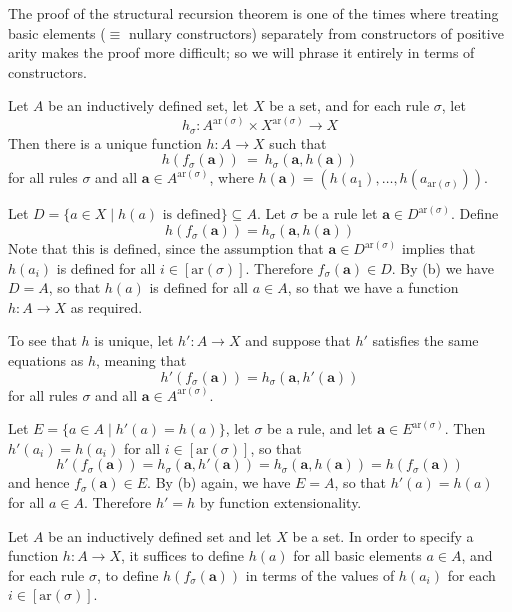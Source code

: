 The proof of the structural recursion theorem is one of the times where treating basic elements ($\equiv$ nullary constructors) separately from constructors of positive arity makes the proof more difficult; so we will phrase it entirely in terms of constructors.

\begin{theorem}
\label{thmStructuralRecursion}
Let $A$ be an inductively defined set, let $X$ be a set, and for each rule $\sigma$, let
\[ h_{\sigma} : A^{\mathrm{ar}(\sigma)} \times X^{\mathrm{ar}(\sigma)} \to X \]
Then there is a unique function $h : A \to X$ such that
\[ h(f_{\sigma}(\mathbf{a})) ~=~ h_{\sigma}(\mathbf{a},h(\mathbf{a})) \]
for all rules $\sigma$ and all $\mathbf{a} \in A^{\mathrm{ar}(\sigma)}$, where $h(\mathbf{a}) = (h(a_1),\dots,h(a_{\mathrm{ar}(\sigma)}))$.
\end{theorem}

\begin{cproof}
Let $D = \{ a \in X \mid h(a) \text{ is defined} \} \subseteq A$. Let $\sigma$ be a rule let $\mathbf{a} \in D^{\mathrm{ar}(\sigma)}$. Define
\[ h(f_{\sigma}(\mathbf{a})) = h_{\sigma}(\mathbf{a},h(\mathbf{a})) \]
Note that this is defined, since the assumption that $\mathbf{a} \in D^{\mathrm{ar}(\sigma)}$ implies that $h(a_i)$ is defined for all $i \in [\mathrm{ar}(\sigma)]$. Therefore $f_{\sigma}(\mathbf{a}) \in D$.
By (b) we have $D=A$, so that $h(a)$ is defined for all $a \in A$, so that we have a function $h : A \to X$ as required.

To see that $h$ is unique, let $h' : A \to X$ and suppose that $h'$ satisfies the same equations as $h$, meaning that
\[ h'(f_{\sigma}(\mathbf{a})) = h_{\sigma}(\mathbf{a},h'(\mathbf{a})) \]
for all rules $\sigma$ and all $\mathbf{a} \in A^{\mathrm{ar}(\sigma)}$.

Let $E = \{ a \in A \mid h'(a) = h(a) \}$, let $\sigma$ be a rule, and let $\mathbf{a} \in E^{\mathrm{ar}(\sigma)}$. Then $h'(a_i) = h(a_i)$ for all $i \in [\mathrm{ar}(\sigma)]$, so that
\[ h'(f_{\sigma}(\mathbf{a})) = h_{\sigma}(\mathbf{a},h'(\mathbf{a})) = h_{\sigma}(\mathbf{a},h(\mathbf{a})) = h(f_{\sigma}(\mathbf{a})) \]
and hence $f_{\sigma}(\mathbf{a}) \in E$. By (b) again, we have $E = A$, so that $h'(a) = h(a)$ for all $a \in A$. Therefore $h'=h$ by function extensionality.
\end{cproof}

\begin{strategy}
\label{strStructuralRecursion}
Let $A$ be an inductively defined set and let $X$ be a set. In order to specify a function $h : A \to X$, it suffices to define $h(a)$ for all basic elements $a \in A$, and for each rule $\sigma$, to define $h(f_{\sigma}(\mathbf{a}))$ in terms of the values of $h(a_i)$ for each $i \in [\mathrm{ar}(\sigma)]$.
\end{strategy}


